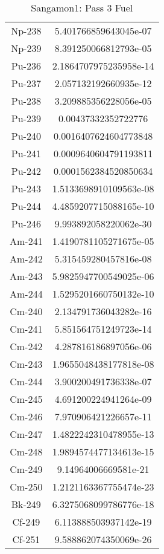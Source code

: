 \begin{table}[h!]
\begin{tabular}{|| c || c |}
Np-238 & 5.401766859643045e-07 \\
Np-239 & 8.391250066812793e-05 \\
Pu-236 & 2.1864707975235958e-14 \\
Pu-237 & 2.057132192660935e-12 \\
Pu-238 & 3.209885356228056e-05 \\
Pu-239 & 0.00437332352722776 \\
Pu-240 & 0.0016407624604773848 \\
Pu-241 & 0.0009640604791193811 \\
Pu-242 & 0.0001562384520850634 \\
Pu-243 & 1.5133698910109563e-08 \\
Pu-244 & 4.4859207715088165e-10 \\
Pu-246 & 9.993892058220062e-30 \\
Am-241 & 1.4190781105271675e-05 \\
Am-242 & 5.315459280457816e-08 \\
Am-243 & 5.9825947700549025e-06 \\
Am-244 & 1.5295201660750132e-10 \\
Cm-240 & 2.134791736043282e-16 \\
Cm-241 & 5.851564751249723e-14 \\
Cm-242 & 4.287816186897056e-06 \\
Cm-243 & 1.9655048438177818e-08 \\
Cm-244 & 3.900200491736338e-07 \\
Cm-245 & 4.691200224941264e-09 \\
Cm-246 & 7.970906421226657e-11 \\
Cm-247 & 1.4822242310478955e-13 \\
Cm-248 & 1.9894574477134613e-15 \\
Cm-249 & 9.14964006669581e-21 \\
Cm-250 & 1.2121163367755474e-23 \\
Bk-249 & 6.3275068099786776e-18 \\
Cf-249 & 6.113888503937142e-19 \\
Cf-251 & 9.588862074350069e-26 \\

\hline
\end{tabular}
\caption{Sangamon1: Pass 3 Fuel}
\label{table:sang1p3fuel}
\end{table}